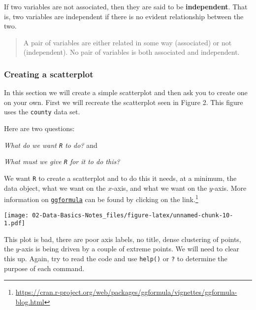 \documentclass[
]{article}
\newenvironment{Shaded}{\begin{snugshade}}{\end{snugshade}}
\newcommand{\KeywordTok}[1]{\textcolor[rgb]{0.13,0.29,0.53}{\textbf{#1}}}
\newcommand{\NormalTok}[1]{#1}
\newcommand{\OperatorTok}[1]{\textcolor[rgb]{0.81,0.36,0.00}{\textbf{#1}}}
\newcommand{\StringTok}[1]{\textcolor[rgb]{0.31,0.60,0.02}{#1}}
\begin{document}
If two variables are not associated, then they are said to be
\textbf{independent}. That is, two variables are independent if there is
no evident relationship between the two.

\begin{quote}
A pair of variables are either related in some way (associated) or not
(independent). No pair of variables is both associated and independent.
\end{quote}

\hypertarget{creating-a-scatterplot}{%
\subsubsection{Creating a scatterplot}\label{creating-a-scatterplot}}

In this section we will create a simple scatterplot and then ask you to
create one on your own. First we will recreate the scatterplot seen in
Figure 2. This figure uses the \texttt{county} data set.

Here are two questions:

\emph{What do we want \texttt{R} to do?} and

\emph{What must we give \texttt{R} for it to do this?}

We want \texttt{R} to create a scatterplot and to do this it needs, at a
minimum, the data object, what we want on the \(x\)-axis, and what we
want on the \(y\)-axis. More information on
\href{https://cran.r-project.org/web/packages/ggformula/vignettes/ggformula-blog.html}{\texttt{ggformula}}
can be found by clicking on the link.\footnote{\url{https://cran.r-project.org/web/packages/ggformula/vignettes/ggformula-blog.html}}

\begin{Shaded}
\end{Shaded}

\texttt{[image: 02-Data-Basics-Notes\_files/figure-latex/unnamed-chunk-10-1.pdf]}

This plot is bad, there are poor axis labels, no title, dense clustering
of points, the \(y\)-axis is being driven by a couple of extreme points.
We will need to clear this up. Again, try to read the code and use
\texttt{help()} or \texttt{?} to determine the purpose of each command.
\end{document}
